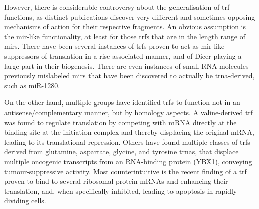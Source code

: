 However, there is considerable controversy about the generalisation of \ac{trf} functions, as distinct publications discover very different and sometimes opposing mechanisms of action for their respective fragments. An obvious assumption is the \ac{mir}-like functionality, at least for those \acp{trf} that are in the length range of \acp{mir}. There have been several instances of \acp{trf} proven to act as \ac{mir}-like suppressors of translation in a \ac{risc}-associated manner,\cite{Kumar2014} and of Dicer playing a large part in their biogenesis.\cite{Cole2009} There are even instances of small RNA molecules previously mislabeled \acp{mir} that have been discovered to actually be \ac{trna}-derived, such as miR-1280.\cite{Huang2017}

On the other hand, multiple groups have identified \acp{trf} to function not in an antisense\-/complementary manner, but by homology aspects. A valine-derived \ac{trf} was found to regulate translation by competing with mRNA directly at the binding site at the initiation complex and thereby displacing the original mRNA, leading to its translational repression.\cite{Gebetsberger2017} Others have found multiple classes of \acp{trf} derived from glutamine, aspartate, glycine, and tyrosine \acp{trna}, that displace multiple oncogenic transcripts from an RNA-binding protein (YBX1), conveying tumour-suppressive activity.\cite{Goodarzi2015} Most counterintuitive is the recent finding of a \ac{trf} proven to bind to several ribosomal protein mRNAs and enhancing their translation, and, when specifically inhibited, leading to apoptosis in rapidly dividing cells.\cite{Kim2017}

